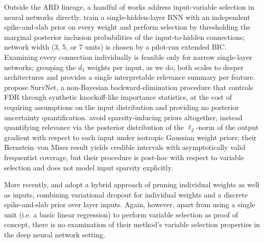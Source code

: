 Outside the ARD lineage, a handful of works address input-variable
selection in neural networks directly. \citet{liang_bayesian_2018}
train a single-hidden-layer BNN with an independent spike-and-slab prior on every weight and
perform selection by thresholding the marginal posterior inclusion
probabilities of the input-to-hidden connections; network width (3,
5, or 7 units) is chosen by a pilot-run extended BIC.  Examining every
connection individually is feasible only for narrow single-layer
networks; grouping the $d_1$ weights per input, as we do, both scales
to deeper architectures and provides a single interpretable relevance
summary per feature.  
\citet{song_variable_2019} propose SurvNet, a non-Bayesian
backward-elimination procedure that controls FDR through synthetic
knockoff-like importance statistics, at the cost of requiring
assumptions on the input distribution and providing no posterior
uncertainty quantification.  \citet{liu_variable_2021} avoid
sparsity-inducing priors altogether, instead quantifying relevance via
the posterior distribution of the $\ell_2$-norm of the output gradient
with respect to each input under isotropic Gaussian weight priors;
their Bernstein--von Mises result yields credible intervals with
asymptotically valid frequentist coverage, but their procedure is
post-hoc with respect to variable selection and does not model input
sparsity explicitly.

More recently, \citet{skaaret-lund_sparsifying_2023} and
\citet{hubin_variational_2023} adopt a hybrid approach of pruning individual weights as well as inputs, combining variational dropout for individual weights and a discrete spike-and-slab prior over layer inputs.  Again, however, apart from using a single unit (i.e. a basic linear regression) to perform variable selection as proof of concept, there is no examination of their method's variable selection properties in the deep neural network setting.


